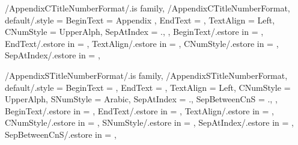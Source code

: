 \newcommand\GetSubSubSectionTitleNumberFormatString{}
\newcommand\SetupSubSubSectionTitleNumberFormatString
{%
  \SetupTitleNumberFormatString{SubSubSection}%
  {%
    BeginText=\GetSSSTitleNumberFormatBeginText,%
    EndText=\GetSSSTitleNumberFormatEndText,%
    CNumStyle=\GetSSSTitleNumberFormatCNumStyle,%
    SNumStyle=\GetSSSTitleNumberFormatSNumStyle,%
    SSNumStyle=\GetSSSTitleNumberFormatSSNumStyle,%
    SSSNumStyle=\GetSSSTitleNumberFormatSSSNumStyle,%
    SepAtIndex=\GetSSSTitleNumberFormatSepAtIndex,%
    SepBetweenCnS=\GetSSSTitleNumberFormatSepBetweenCnS,%
    SepBetweenSnSS=\GetSSSTitleNumberFormatSepBetweenSnSS,%
    SepBetweenSSCnSSS=\GetSSSTitleNumberFormatSepBetweenSSCnSSS,%
    CCounterName=chapter,%
    SCounterName=section,%
    SSCounterName=subsection,%
    SSSCounterName=subsubsection,%
  }{\GetSubSubSectionTitleNumberFormatString}%
} %


\pgfkeys
{
  /AppendixCTitleNumberFormat/.is family, /AppendixCTitleNumberFormat,
  default/.style =
  {
    BeginText = {Appendix },
    EndText = \empty,
    TextAlign = {Left}, %
    CNumStyle = UpperAlph,
    SepAtIndex = {.},
  },
  BeginText/.estore in = \GetAppendixCTitleNumberFormatBeginText,
  EndText/.estore in = \GetAppendixCTitleNumberFormatEndText,
  TextAlign/.estore in = \GetAppendixCTitleNumberFormatTextAlign,
  CNumStyle/.estore in = \GetAppendixCTitleNumberFormatCNumStyle,
  SepAtIndex/.estore in = \GetAppendixCTitleNumberFormatSepAtIndex,
} %

\newcommand\GetAppendixChapterTitleNumberFormatString{}
\newcommand\SetupAppendixChapterTitleNumberFormatString
{%
  \SetupTitleNumberFormatString{AppendixChapter}%
  {%
    BeginText=\GetAppendixCTitleNumberFormatBeginText,%
    EndText=\GetAppendixCTitleNumberFormatEndText,%
    CNumStyle=\GetAppendixCTitleNumberFormatCNumStyle,%
    CCounterName=appendixchapter,%
  }{\GetAppendixChapterTitleNumberFormatString}%
} %


\pgfkeys
{
  /AppendixSTitleNumberFormat/.is family, /AppendixSTitleNumberFormat,
  default/.style =
  {
    BeginText = \empty,
    EndText = \empty,
    TextAlign = {Left},
    CNumStyle = UpperAlph,
    SNumStyle = Arabic,
    SepAtIndex = {.}, %
    SepBetweenCnS = {.}, %
  },
  BeginText/.estore in = \GetAppendixSTitleNumberFormatBeginText,
  EndText/.estore in = \GetAppendixSTitleNumberFormatEndText,
  TextAlign/.estore in = \GetAppendixSTitleNumberFormatTextAlign,
  CNumStyle/.estore in = \GetAppendixSTitleNumberFormatCNumStyle,
  SNumStyle/.estore in = \GetAppendixSTitleNumberFormatSNumStyle,
  SepAtIndex/.estore in = \GetAppendixSTitleNumberFormatSepAtIndex,
  SepBetweenCnS/.estore in = \GetAppendixSTitleNumberFormatSepBetweenCnS,
} %


